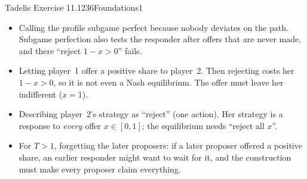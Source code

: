\begin{exsol}{Tadelis Exercise 11.1}{236}{Foundations}{1}
\mistakes
\begin{itemize}
  \item Calling the profile subgame perfect because nobody deviates on the path. Subgame perfection
  also tests the responder after offers that are never made, and there ``reject $1 - x > 0$'' fails.
  \item Letting player~1 offer a positive share to player~2. Then rejecting costs her $1 - x > 0$, so
  it is not even a Nash equilibrium. The offer must leave her indifferent ($x = 1$).
  \item Describing player~2's strategy as ``reject'' (one action). Her strategy is a response to
  \emph{every} offer $x \in [0,1]$; the equilibrium needs ``reject all $x$''.
  \item For $T > 1$, forgetting the later proposers: if a later proposer offered a positive share,
  an earlier responder might want to wait for it, and the construction must make every proposer claim
  everything.
\end{itemize}

\end{exsol}
